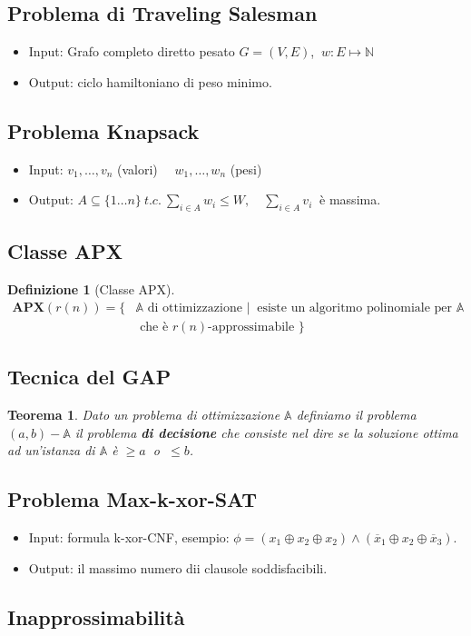 \documentclass[a4paper]{article}
\newtheorem{thm}{Teorema}[subsection]
\theoremstyle{definition}
\newtheorem{definit}{Definizione}[subsection]
\newcommand{\N}{\mathbb{N}}
\newcommand{\apx}{\mathbf{APX}}
\newcommand{\prob}[1]{\mathbb{#1}}
\begin{document}
		
		\subsection{Problema di Traveling Salesman}
			\begin{itemize}
				\item Input: Grafo completo diretto pesato $ G = (V, E) $, $ \ w : E \mapsto \N $
				\item Output: ciclo hamiltoniano di peso minimo.
			\end{itemize}
		
		\subsection{Problema Knapsack}
			\begin{itemize}
				\item Input: $ v_1, \dots, v_n $ (valori) $ \quad w_1, \dots, w_n $ (pesi)
				\item Output: $ A \subseteq \{1\dots n \} \ t.c.\ \sum\limits_{i \in A} w_i \leq W,\quad \sum\limits_{i \in A} v_i \ $ è massima.
			\end{itemize}
		
		\subsection{Classe APX}
			\begin{definit}[Classe APX]
				\begin{align*}
					\apx(r(n)) = \big\lbrace & \prob{A} \text{ di ottimizzazione } \Big| \ \text{ esiste un algoritmo polinomiale per } \prob{A} \\
					& \text{ che è } r(n)\text{-approssimabile } \big\rbrace
				\end{align*}
			\end{definit}
		
		\subsection{Tecnica del GAP}
			\begin{thm}
				Dato un problema di ottimizzazione $ \prob{A} $ definiamo il problema $ (a, b) - \prob{A} $ il problema \textbf{di decisione} che consiste nel dire se la soluzione ottima ad un'istanza di $ \prob{A} $ è $ \geq a \ $ o $ \ \leq b $.
			\end{thm}
		
		\subsection{Problema Max-k-xor-SAT}
			\begin{itemize}
				\item Input: formula k-xor-CNF, esempio: $ \phi = (x_1 \oplus x_2\oplus x_2) \wedge (\overline{x}_1 \oplus x_2 \oplus \overline{x}_3) $.
				\item Output: il massimo numero dii clausole soddisfacibili.
			\end{itemize}
		
		\subsection{Inapprossimabilità}
		
		
\end{document}
